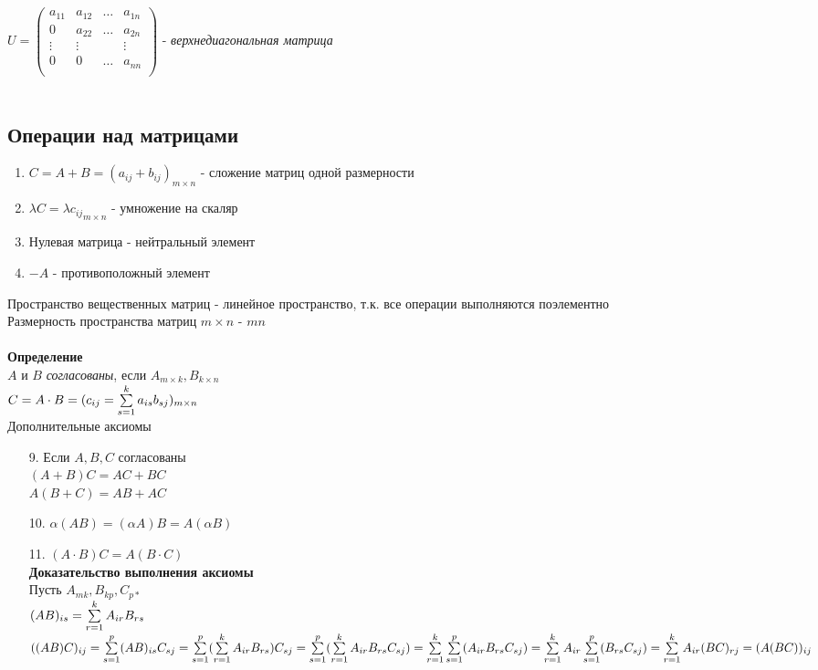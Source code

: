 \documentclass[12pt]{article}
\begin{document}
$U = \begin{pmatrix}
a_{11} & a_{12} & \ldots & a_{1n}\\
0 & a_{22} & \ldots & a_{2n}\\
\vdots & \vdots &  & \vdots\\
0 & 0 & \ldots & a_{nn}\\\end{pmatrix}$ - \textit{верхнедиагональная матрица}\\\\
\subsection{Операции над матрицами}
\begin{enumerate}
    \item $C = A+ B = (a_{ij} + b_{ij})_{m\times n}$ - сложение матриц одной размерности
    \item $\lambda C = {\lambda c_{ij}}_{m\times n}$ - умножение на скаляр
    \item Нулевая матрица - нейтральный элемент
    \item $-A$ - противоположный элемент
\end{enumerate}
Пространство вещественных матриц - линейное пространство, т.к. все операции выполняются поэлементно\\
Размерность пространства матриц $m\times n$ - $mn$\\\\
\textbf{Определение}\\
$A$ и $B$ \textit{согласованы}, если $A_{m\times k}, B_{k\times n}$\\
$C = A\cdot B = ( c_{ij} = \sum\limits_{s=1}^k a_{is}b_{sj})_{m\times n}$\\
Дополнительные аксиомы
\begin{enumerate}
    \item[9.]  Если $A,B,C$ согласованы\\
    $(A+B)C = AC+BC$\\
    $A(B+C) = AB+AC$
    \item[10.] $\alpha(AB) = (\alpha A)B = A(\alpha B)$
    \item[11.] $(A\cdot B)C = A(B\cdot C)$\\
    \textbf{Доказательство выполнения аксиомы}\\
    Пусть $A_{mk}, B_{kp}, C_{p*}$\\
    $(AB)_{is} = \sum\limits_{r=1}^k A_{ir}B_{rs}$\\
    $((AB)C)_{ij} = \sum\limits_{s=1}^p (AB)_{is}C_{sj} = \sum\limits_{s=1}^p (\sum\limits_{r=1}^k A_{ir}B_{rs})C_{sj} = \sum\limits_{s=1}^p (\sum\limits_{r=1}^k A_{ir}B_{rs}C_{sj}) = \sum\limits_{r=1}^k\sum\limits_{s=1}^p ( A_{ir}B_{rs}C_{sj}) = \sum\limits_{r=1}^k A_{ir} \sum\limits_{s=1}^p ( B_{rs}C_{sj}) = \sum\limits_{r=1}^k A_{ir} ( BC)_{rj} = (A(BC))_{ij}$
\end{enumerate}
\end{document}
